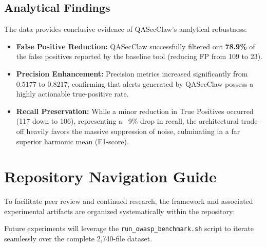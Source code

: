 \documentclass[11pt,a4paper]{article}
\begin{document}
\subsection{Analytical Findings}
The data provides conclusive evidence of QASecClaw's analytical robustness:
\begin{itemize}
    \item \textbf{False Positive Reduction:} QASecClaw successfully filtered out \textbf{78.9\%} of the false positives reported by the baseline tool (reducing FP from 109 to 23).
    \item \textbf{Precision Enhancement:} Precision metrics increased significantly from $0.5177$ to $0.8217$, confirming that alerts generated by QASecClaw possess a highly actionable true-positive rate.
    \item \textbf{Recall Preservation:} While a minor reduction in True Positives occurred (117 down to 106), representing a ~9\% drop in recall, the architectural trade-off heavily favors the massive suppression of noise, culminating in a far superior harmonic mean (F1-score).
\end{itemize}

\section{Repository Navigation Guide}
To facilitate peer review and continued research, the framework and associated experimental artifacts are organized systematically within the repository:

\vspace{0.3cm}

\vspace{0.5cm}
\noindent Future experiments will leverage the \texttt{run\_owasp\_benchmark.sh} script to iterate seamlessly over the complete 2,740-file dataset.
\end{document}
